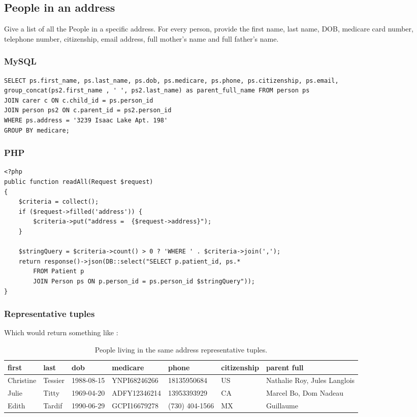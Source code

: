 \subsection{People in an address}
Give a list of all the People in a specific address. For every person, provide
the first name, last name, DOB, medicare card number, telephone number,
citizenship, email address, full mother’s name and full father’s name.
\subsubsection{MySQL}
\begin{verbatim}
SELECT ps.first_name, ps.last_name, ps.dob, ps.medicare, ps.phone, ps.citizenship, ps.email,
group_concat(ps2.first_name , ' ', ps2.last_name) as parent_full_name FROM person ps
JOIN carer c ON c.child_id = ps.person_id
JOIN person ps2 ON c.parent_id = ps2.person_id
WHERE ps.address = '3239 Isaac Lake Apt. 198'
GROUP BY medicare;
\end{verbatim}

\subsubsection{PHP}
\begin{verbatim}
<?php
public function readAll(Request $request)
{
    $criteria = collect();
    if ($request->filled('address')) {
        $criteria->put("address =  {$request->address}");
    }
    
    $stringQuery = $criteria->count() > 0 ? 'WHERE ' . $criteria->join(',');
    return response()->json(DB::select("SELECT p.patient_id, ps.*
        FROM Patient p
        JOIN Person ps ON p.person_id = ps.person_id $stringQuery"));
}
\end{verbatim}
\subsubsection{Representative tuples}
Which would return something like :
\begin{table}[ht]
\centering
    \begin{tabular}{|l|l|l|l|l|l|l|} 
        \hline
        first & last & dob & medicare & phone & citizenship & parent full \\
        \hline 
        Christine & Tessier & 1988-08-15 & YNPI68246266 & 18135950684 & US & Nathalie Roy, Jules Langlois\\
        Julie & Titty & 1969-04-20 & ADFY12346214 & 13953393929 & CA & Marcel Bo, Dom Nadeau \\
        Edith & Tardif & 1990-06-29 & GCPI16679278 & (730) 404-1566 & MX & Guillaume\\
        \hline
    \end{tabular}
    \caption{People living in the same address representative tuples.}
    \end{table}
